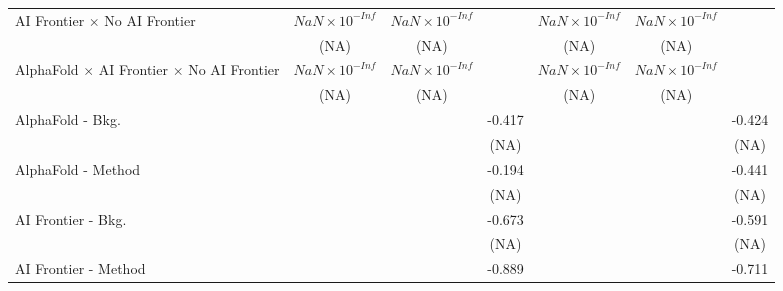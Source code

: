 \begin{tabular}{lcccccc}
   AI Frontier $\times$ No AI Frontier                                        & $NaN\times 10^{-Inf}$  & $NaN\times 10^{-Inf}$  &                        & $NaN\times 10^{-Inf}$  & $NaN\times 10^{-Inf}$  &   \\   
                                                                              & (NA)                   & (NA)                   &                        & (NA)                   & (NA)                   &   \\   
   AlphaFold $\times$ AI Frontier $\times$ No AI Frontier                     & $NaN\times 10^{-Inf}$  & $NaN\times 10^{-Inf}$  &                        & $NaN\times 10^{-Inf}$  & $NaN\times 10^{-Inf}$  &   \\   
                                                                              & (NA)                   & (NA)                   &                        & (NA)                   & (NA)                   &   \\   
   AlphaFold - Bkg.                                                           &                        &                        & -0.417                 &                        &                        & -0.424\\   
                                                                              &                        &                        & (NA)                   &                        &                        & (NA)\\   
   AlphaFold - Method                                                         &                        &                        & -0.194                 &                        &                        & -0.441\\   
                                                                              &                        &                        & (NA)                   &                        &                        & (NA)\\   
   AI Frontier - Bkg.                                                         &                        &                        & -0.673                 &                        &                        & -0.591\\   
                                                                              &                        &                        & (NA)                   &                        &                        & (NA)\\   
   AI Frontier - Method                                                       &                        &                        & -0.889                 &                        &                        & -0.711\\   

\end{tabular}
